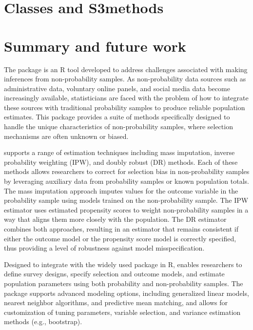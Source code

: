 \documentclass[
]{jss}
\begin{document}
\section{Classes and S3methods}\label{sec-s3methods}

\section{Summary and future work}\label{summary-and-future-work}

The  package is an R tool developed to address
challenges associated with making inferences from non-probability
samples. As non-probability data sources such as administrative data,
voluntary online panels, and social media data become increasingly
available, statisticians are faced with the problem of how to integrate
these sources with traditional probability samples to produce reliable
population estimates. This package provides a suite of methods
specifically designed to handle the unique characteristics of
non-probability samples, where selection mechanisms are often unknown or
biased.

 supports a range of estimation techniques including
mass imputation, inverse probability weighting (IPW), and doubly robust
(DR) methods. Each of these methods allows researchers to correct for
selection bias in non-probability samples by leveraging auxiliary data
from probability samples or known population totals. The mass imputation
approach imputes values for the outcome variable in the probability
sample using models trained on the non-probability sample. The IPW
estimator uses estimated propensity scores to weight non-probability
samples in a way that aligns them more closely with the population. The
DR estimator combines both approaches, resulting in an estimator that
remains consistent if either the outcome model or the propensity score
model is correctly specified, thus providing a level of robustness
against model misspecification.

Designed to integrate with the widely used  package in R,
 enables researchers to define survey designs, specify
selection and outcome models, and estimate population parameters using
both probability and non-probability samples. The package supports
advanced modeling options, including generalized linear models, nearest
neighbor algorithms, and predictive mean matching, and allows for
customization of tuning parameters, variable selection, and variance
estimation methods (e.g., bootstrap).
\end{document}
